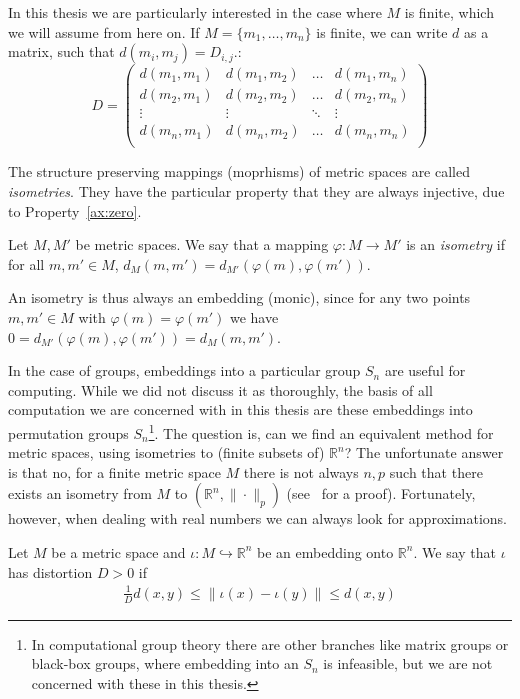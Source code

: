 In this thesis we are particularly interested in the case where $M$ is finite, which we will assume from here on. 
If $M = \{ m_1, \ldots, m_n \}$ is finite, we can write $d$ as a matrix, such that $d(m_i,m_j) = D_{i,j}$.:
\begin{equation*}
    D = 
\left(
\begin{array}{cccc}
d(m_1,m_1) & d(m_1,m_2) & \ldots & d(m_1,m_n) \\
d(m_2,m_1) & d(m_2,m_2) & \ldots & d(m_2,m_n) \\
\vdots & \vdots & \ddots & \vdots \\
d(m_n,m_1) & d(m_n,m_2) & \ldots & d(m_n,m_n) \\
\end{array}
\right)
\end{equation*}

The structure preserving mappings (moprhisms) of metric spaces are called \emph{isometries}. They have the particular property that they are always injective, due to Property~\ref{ax:zero}.
\begin{defn}
Let $M,M'$ be metric spaces. We say that a mapping $\varphi : M \rightarrow M'$ is an \emph{isometry} if for all $m,m' \in M$, $d_M(m,m') = d_{M'}(\varphi(m),\varphi(m'))$.
\end{defn}
An isometry is thus always an embedding (monic), since for any two points $m,m' \in M$ with $\varphi(m) = \varphi(m')$ we have $0 = d_{M'}(\varphi(m),\varphi(m')) = d_{M}(m,m')$.

In the case of groups, embeddings into a particular group $S_n$ are useful for computing.
While we did not discuss it as thoroughly, the basis of all computation we are concerned with in this thesis are these embeddings into permutation groups 
$S_n$\footnote{In computational group theory there are other branches like matrix groups or black-box groups, where embedding into an $S_n$ is infeasible,
but we are not concerned with these in this thesis.}.
The question is, can we find an equivalent method for metric spaces, using isometries to (finite subsets of) $\mathbb{R}^n$? 
The unfortunate answer is that no, for a finite metric space $M$ there is not always $n,p$ such that there exists an isometry from $M$ to $(\mathbb{R}^n,\|\cdot\|_p)$ (see~\cite{matouvsek} for a proof).
Fortunately, however, when dealing with real numbers we can always look for approximations.

\begin{defn}
Let $M$ be a metric space and $\iota: M \hookrightarrow \mathbb{R}^n$ be an embedding onto $\mathbb{R}^n$. 
We say that $\iota$ has distortion $D > 0$ if 
\begin{align*} \frac{1}{D} d(x,y) \leq \| \iota(x) - \iota(y) \| \leq d(x,y) \end{align*}
\end{defn}

